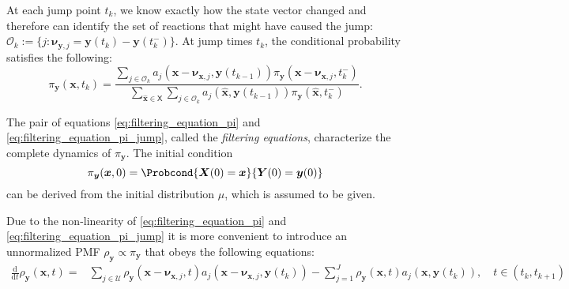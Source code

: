 At each jump point $t_k$, we know exactly how the state vector changed and therefore can identify the set of reactions that might have caused the jump: $\mathcal{O}_k := \{ j : \boldsymbol{\nu}_{\boldsymbol{y}, j} = \boldsymbol{y}(t_k) - \boldsymbol{y}(t_k^{-}) \}$. At jump times $t_k$, the conditional probability satisfies the following:
\begin{equation}
    \label{eq:filtering_equation_pi_jump}
    \pi_{\boldsymbol{y}} (\boldsymbol{x}, t_k) = \frac{ 
    \sum\limits_{j \in \mathcal{O}_k} a_j (\boldsymbol{x} - \boldsymbol{\nu}_{\boldsymbol{x}, j}, \boldsymbol{y}(t_{k-1})) \pi_{\boldsymbol{y}} (\boldsymbol{x} - \boldsymbol{\nu}_{\boldsymbol{x}, j}, t_{k}^{-})
    }{ 
    \sum\limits_{\hat{\boldsymbol{x}} \in \mathsf{X}} \sum\limits_{j \in \mathcal{O}_k} a_j (\hat{\boldsymbol{x}}, \boldsymbol{y}(t_{k-1})) \pi_{\boldsymbol{y}} (\hat{\boldsymbol{x}}, t_k^{-})
    }.
\end{equation}

The pair of equations \eqref{eq:filtering_equation_pi} and \eqref{eq:filtering_equation_pi_jump}, called the \textit{filtering equations}, characterize the complete dynamics of $\pi_{\boldsymbol{y}}$. The initial condition 
\begin{equation}
\label{eq:pi0_def}
    \pi_{\boldsymbol{y}} (\boldsymbol{x}, 0) = \Probcond{\boldsymbol{X}(0) = \boldsymbol{x}}{\boldsymbol{Y}(0) = \boldsymbol{y}(0)} 
\end{equation} 
can be derived from the initial distribution $\mu$, which is assumed to be given.

Due to the non-linearity of \eqref{eq:filtering_equation_pi} and \eqref{eq:filtering_equation_pi_jump} it is more convenient to introduce an unnormalized \ac{PMF} $\rho_{\boldsymbol{y}} \propto \pi_{\boldsymbol{y}}$ that obeys the following equations:
\begin{equation}
\label{eq:filtering_equation_rho}
\begin{aligned}
    \frac{\mathrm{d}}{\mathrm{d} t} \rho_{\boldsymbol{y}} (\boldsymbol{x}, t) = &\sum_{j \in \mathcal{U}} \rho_{\boldsymbol{y}} (\boldsymbol{x} - \boldsymbol{\nu}_{\boldsymbol{x}, j}, t) a_j (\boldsymbol{x}-\boldsymbol{\nu}_{\boldsymbol{x}, j}, \boldsymbol{y}(t_k))
    - \sum_{j=1}^{J} \rho_{\boldsymbol{y}} (\boldsymbol{x}, t) a_j (\boldsymbol{x},\boldsymbol{y}(t_k)),  \quad t \in (t_k, t_{k+1}) 
\end{aligned}
\end{equation}


